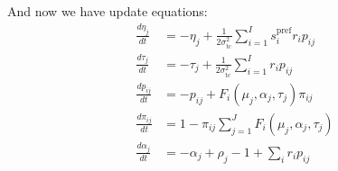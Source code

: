 \documentclass[12pt]{article}
\begin{document}
And now we have update equations: 
\begin{equation}
\begin{aligned}
\frac{d \eta_j}{dt} &= - \eta_j + \frac{1}{2 \sigma_{\text{tc}}^2} \sum_{i=1}^I s_i^{\text{pref}} r_i p_{ij}\\
\frac{d \tau_j}{dt} &= - \tau_j + \frac{1}{2 \sigma_{\text{tc}}^2} \sum_{i=1}^I r_i p_{ij}\\
\frac{d p_{ij}}{dt} &= - p_{ij} + F_i(\mu_j, \alpha_j, \tau_j) \pi_{ij}\\
\frac{d \pi_{ij}}{dt} &= 1 - \pi_{ij} \sum_{j=1}^J F_i(\mu_j, \alpha_j, \tau_j)\\
\frac{d \alpha_j}{dt} &= - \alpha_j + \rho_j - 1 + \sum_i r_i p_{ij}\\
\end{aligned}
\end{equation}
\iffalse
(Assume normalization is $\tau$ then we want to normalize all p terms by $\frac{1}{\tau}$. $\tau^{-1} = \prod C^{N_{ij}} = C^{\sum_j N_{ij}} = $ constant)
\fi
\end{document}
